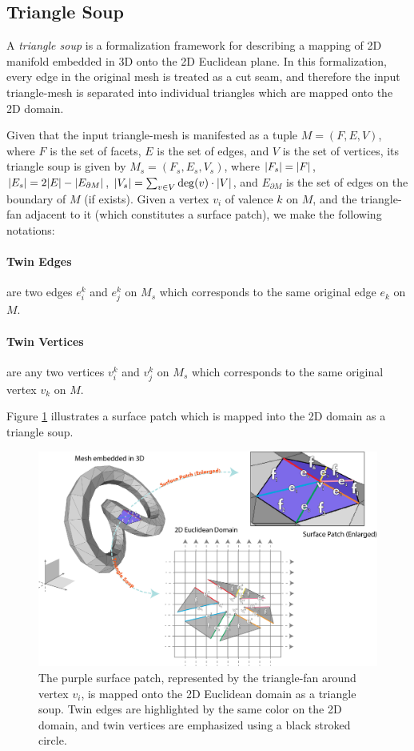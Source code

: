 \subsection{Triangle Soup}
A \emph{triangle soup} is a formalization framework for describing a mapping of 2D manifold embedded in 3D onto the 2D Euclidean plane. In this formalization, every edge in the original mesh is treated as a cut seam, and therefore the input triangle-mesh is separated into individual triangles which are mapped onto the 2D domain.

\noindent Given that the input triangle-mesh is manifested as a tuple $M = (F,E,V)$, where $F$ is the set of facets, $E$ is the set of edges, and $V$ is the set of vertices, its triangle soup is given by $M_s = (F_s,E_s,V_s)$, where $\lvert F_s\rvert = \lvert F\rvert$, $\lvert E_s\rvert = 2\lvert E\rvert - \lvert E_{\partial M}\rvert$, $\lvert V_s\rvert = \sum_{v \in V} \mathrm{deg}(v) \cdot\lvert V\rvert$, and $E_{\partial M}$ is the set of edges on the boundary of $M$ (if exists). Given a vertex $v_i$ of valence $k$ on $M$, and the triangle-fan adjacent to it (which constitutes a surface patch), we make the following notations:

\paragraph{Twin Edges} are two edges $e_i^k$ and $e_j^k$ on $M_s$ which corresponds to the same original edge $e_k$ on $M$.

\paragraph{Twin Vertices} are any two vertices $v_i^k$ and $v_j^k$ on $M_s$ which corresponds to the same original vertex $v_k$ on $M$.

\noindent Figure \ref{fig:triangle_soup} illustrates a surface patch which is mapped into the 2D domain as a triangle soup.

\begin{figure}[ht]
\centering
\includegraphics[width=16cm]{figures/triangle_soup.png}
\caption[Triangle Soup]{The purple surface patch, represented by the triangle-fan around vertex $v_i$, is mapped onto the 2D Euclidean domain as a triangle soup. Twin edges are highlighted by the same color on the 2D domain, and twin vertices are emphasized using a black stroked circle.}
\label{fig:triangle_soup}
\end{figure}

